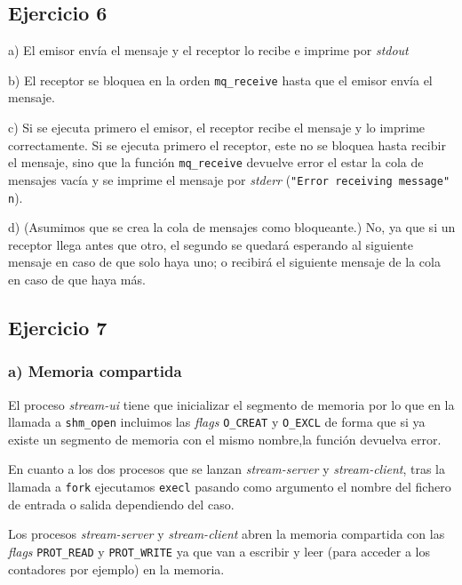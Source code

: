 \documentclass{article}
\begin{document}
\subsection*{Ejercicio 6}


a) El emisor envía el mensaje y el receptor lo recibe e imprime por \textit{stdout}

b) El receptor se bloquea en la orden \texttt{mq\_receive} hasta que el emisor envía el mensaje.

c) Si se ejecuta primero el emisor, el receptor recibe el mensaje y lo imprime correctamente. Si se ejecuta primero el receptor, este no se bloquea hasta recibir el mensaje, sino que la función \texttt{mq\_receive} devuelve error el estar la cola de mensajes vacía y se imprime el mensaje por \textit{stderr}
(\texttt{"Error  receiving  message"\\n}). 

d) (Asumimos que se crea la cola de mensajes como bloqueante.) No, ya que si un receptor llega antes que otro, el segundo se quedará esperando al siguiente mensaje en caso de que solo haya uno; o recibirá el siguiente mensaje de la cola en caso de que haya más.




\subsection*{Ejercicio 7}


\subsubsection*{a) Memoria compartida}

El proceso \textit{stream-ui} tiene que inicializar el segmento de memoria por lo que en la llamada a \texttt{shm\_open} incluimos las \textit{flags} \texttt{O\_CREAT} y \texttt{O\_EXCL} de forma que si ya existe un segmento de memoria con el mismo nombre,la función devuelva error.

En cuanto a los dos procesos que se lanzan \textit{stream-server} y \textit{stream-client}, tras la llamada a \texttt{fork} ejecutamos \texttt{execl} pasando como argumento el nombre del fichero de entrada o salida dependiendo del caso.

Los procesos \textit{stream-server} y \textit{stream-client} abren la memoria compartida con las \textit{flags} \texttt{PROT\_READ} y \texttt{PROT\_WRITE} ya que van a escribir y leer (para acceder a los contadores por ejemplo) en la memoria.
\end{document}
